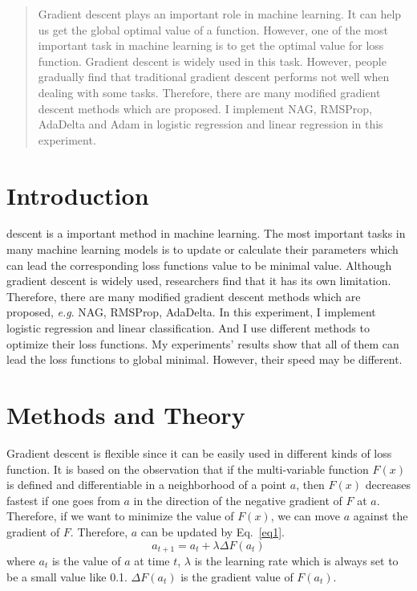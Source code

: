 \documentclass[journal, a4paper]{IEEEtran}
\begin{document}
\begin{abstract}
Gradient descent plays an important role in machine learning. It can help us get the global optimal value of a function. However, one of the most important task in machine learning is to get the optimal value for loss function. Gradient descent is widely used in this task. However, people gradually find that traditional gradient descent performs not well when dealing with some tasks. Therefore, there are many modified gradient descent methods which are proposed. I implement NAG, RMSProp, AdaDelta and Adam in logistic regression and linear regression in this experiment.
\end{abstract}

\section{Introduction}
 descent is a important method in machine learning. The most important tasks in many machine learning models is to update or calculate their parameters which can lead the corresponding loss functions value to be minimal value. Although gradient descent is widely used, researchers find that it has its own limitation. Therefore, there are many modified gradient descent methods which are proposed, \emph{e.g}. NAG, RMSProp, AdaDelta. In this experiment, I implement logistic regression and linear classification. And I use different methods to optimize their loss functions. My experiments' results show that all of them can lead the loss functions to global minimal. However, their speed may be different.

\section{Methods and Theory}
Gradient descent is flexible since it can be easily used in different kinds of loss function. It is based on the observation that if the multi-variable function $F(x)$ is defined and differentiable in a neighborhood of a point $a$, then $F(x)$ decreases fastest if one goes from $a$ in the direction of the negative gradient of $F$ at $a$. Therefore, if we want to minimize the value of $F(x)$, we can move $a$ against the gradient of $F$. Therefore, $a$ can be updated by Eq.~\eqref{eq1}.
\begin{equation}
a_{t+1}=a_{t} + \lambda \Delta F(a_{t}) \label{eq1}
\end{equation}
where $a_{t}$ is the value of $a$ at time $t$, $\lambda$ is the learning rate which is always set to be a small value like 0.1. $\Delta F(a_{t})$ is the gradient value of $F(a_{t})$.
\end{document}
